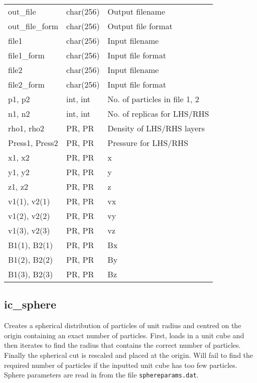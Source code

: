 \documentclass[a4paper]{article}
\newcommand{\var}[1]{\texttt{#1}}
\begin{document}
\vspace{0.1cm}

\begin{center}
\begin{supertabular}{|p{3cm}|p{2cm}|p{8cm}|}
out\_file        & char(256) & Output filename \\
out\_file\_form  & char(256) & Output file format \\
file1            & char(256) & Input filename \\
file1\_form      & char(256) & Input file format \\
file2            & char(256) & Input filename \\
file2\_form      & char(256) & Input file format \\
p1, p2           & int, int  & No. of particles in file 1, 2 \\
n1, n2           & int, int  & No. of replicas for LHS/RHS \\
rho1, rho2       & PR, PR    & Density of LHS/RHS layers \\
Press1, Press2   & PR, PR    & Pressure for LHS/RHS \\
x1, x2           & PR, PR    & x \\
y1, y2           & PR, PR    & y \\
z1, z2           & PR, PR    & z \\
v1(1), v2(1)     & PR, PR    & vx \\
v1(2), v2(2)     & PR, PR    & vy \\
v1(3), v2(3)     & PR, PR    & vz \\
B1(1), B2(1)     & PR, PR    & Bx \\
B1(2), B2(2)     & PR, PR    & By \\
B1(3), B2(3)     & PR, PR    & Bz \\
\end{supertabular}
\end{center}

\newpage


\subsection{ic\_sphere}
Creates a spherical distribution of particles of unit radius and centred on the origin containing an exact number of particles.  First, loads in a unit cube and then iterates to find the radius that contains the correct number of particles.  Finally the spherical cut is rescaled and placed at the origin.  Will fail to find the required number of particles if the inputted unit cube has too few particles.  Sphere parameters are read in from the file \var{sphereparams.dat}. \newline
\end{document}
